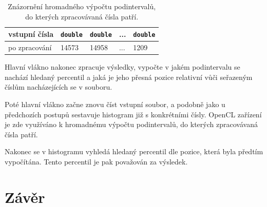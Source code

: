 \documentclass[12pt, a4paper]{article}
\let\oldsection\section
\renewcommand\section{\clearpage\oldsection}
\begin{document}
\begin{table}[!ht]
    \begin{center}
        \begin{tabular}{ | m{6.5em} | m{1.5cm}| m{1.5cm} | m{1.5cm} | m{1.5cm} | } 
             \hline
             vstupní čísla & \texttt{double} & \texttt{double} & ... & \texttt{double} \\ 

             \hline
              po zpracování &  14573 & 14958 & ... & 1209 \\  

             \hline
        \end{tabular}
    \end{center}
    \caption{\label{tab:opencl-bucket-computation}Znázornění hromadného výpočtu podintervalů, do kterých zpracovávaná čísla patří.}
\end{table}

Hlavní vlákno nakonec zpracuje výsledky, vypočte v jakém podintervalu se nachází hledaný percentil a jaká je jeho přesná pozice relativní vůči seřazeným číslům nacházejících se v souboru.

Poté hlavní vlákno začne znovu číst vstupní soubor, a podobně jako u předchozích postupů sestavuje histogram již s konkrétními čísly.
OpenCL zařízení je zde využíváno k hromadnému výpočtu podintervalů, do kterých zpracovávaná čísla patří.

Nakonec se v histogramu vyhledá hledaný percentil dle pozice, která byla předtím vypočítána.
Tento percentil je pak považován za výsledek.

\section{Závěr}
\end{document}
